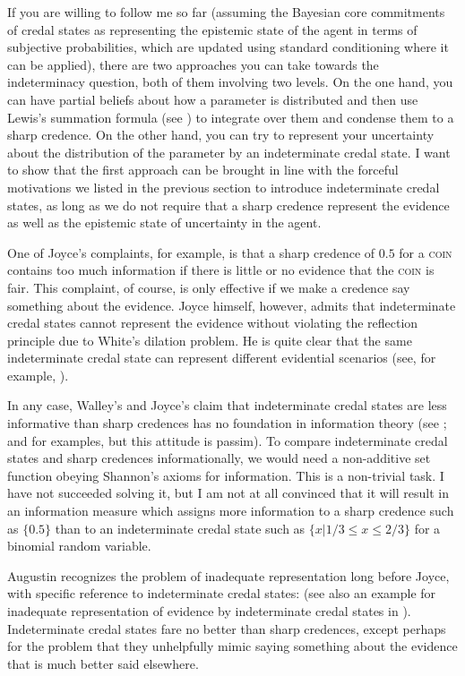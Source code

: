 If you are willing to follow me so far (assuming the Bayesian core commitments of credal states as representing the epistemic state of the agent in terms of subjective probabilities, which are updated using standard conditioning where it can be applied), there are two approaches you can take towards the indeterminacy question, both of them involving two levels. On the one hand, you can have partial beliefs about how a parameter is distributed and then use Lewis's summation formula (see ) to integrate over them and condense them to a sharp credence. On the other hand, you can try to represent your uncertainty about the distribution of the parameter by an indeterminate credal state. I want to show that the first approach can be brought in line with the forceful motivations we listed in the previous section to introduce indeterminate credal states, as long as we do not require that a sharp credence represent the evidence as well as the epistemic state of uncertainty in the agent.

One of Joyce's complaints, for example, is that a sharp credence of $0.5$ for a \textsc{coin} contains too much information if there is little or no evidence that the \textsc{coin} is fair. This complaint, of course, is only effective if we make a credence say something about the evidence. Joyce himself, however, admits that indeterminate credal states cannot represent the evidence without violating the reflection principle due to White's dilation problem. He is quite clear that the same indeterminate credal state can represent different evidential scenarios (see, for example, ).

In any case, Walley's and Joyce's claim that indeterminate credal states are less informative than sharp credences has no foundation in information theory (see ; and  for examples, but this attitude is passim). To compare indeterminate credal states and sharp credences informationally, we would need a non-additive set function obeying Shannon's axioms for information. This is a non-trivial task. I have not succeeded solving it, but I am not at all convinced that it will result in an information measure which assigns more information to a sharp credence such as $\{0.5\}$ than to an indeterminate credal state such as $\{x|1/3\leq{}x\leq{}2/3\}$ for a binomial random variable.

Augustin recognizes the problem of inadequate representation long before Joyce, with specific reference to indeterminate credal states:   (see also an example for inadequate representation of evidence by indeterminate credal states in ). Indeterminate credal states fare no better than sharp credences, except perhaps for the problem that they unhelpfully mimic saying something about the evidence that is much better said elsewhere.

